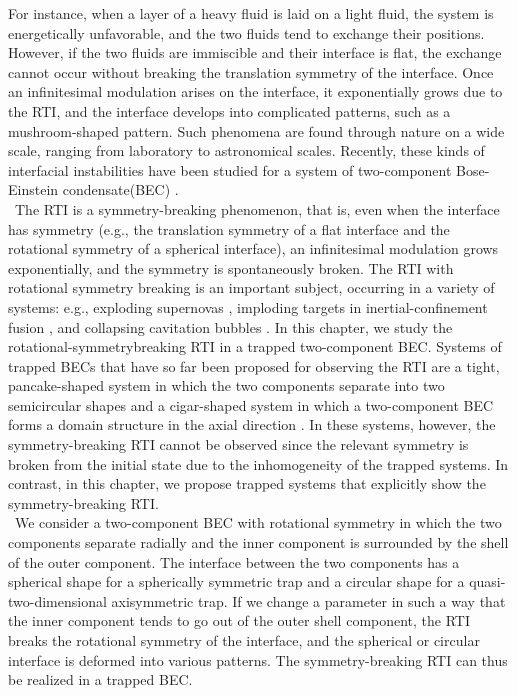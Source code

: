 \documentclass[12pt,a4paper]{report}
\begin{document}
For instance, when a layer of a heavy fluid is laid on a light fluid,
the system is energetically unfavorable, and the two fluids tend to exchange their positions.
However, if the two fluids are immiscible and their interface is flat,
the exchange cannot occur without breaking the translation symmetry of the interface.
Once an infinitesimal modulation arises on the interface,
it exponentially grows due to the RTI,
and the interface develops into complicated patterns,
such as a mushroom-shaped pattern.
Such phenomena are found through nature on a wide scale,
ranging from laboratory to astronomical scales.
Recently, these kinds of interfacial instabilities have been
studied for a system of two-component Bose-Einstein condensate(BEC) \cite{62}\cite{63}\cite{64}\cite{65}.
\\
\ The RTI is a symmetry-breaking phenomenon, that is,
even when the interface has symmetry
(e.g., the translation symmetry of a flat interface and the rotational symmetry
of a spherical interface), an infinitesimal modulation grows
exponentially, and the symmetry is spontaneously broken.
The RTI with rotational symmetry breaking is an important subject,
occurring in a variety of systems:
e.g., exploding supernovas \cite{66}\cite{67}\cite{68}, 
imploding targets in inertial-confinement fusion \cite{69},
and collapsing cavitation bubbles \cite{70} \cite{71}.
In this chapter, we study the rotational-symmetrybreaking RTI
in a trapped two-component BEC.
Systems of trapped BECs that have so far been proposed for observing the RTI
are a tight,
pancake-shaped system in which the two components separate into two semicircular shapes \cite{62}
and a cigar-shaped system in which a two-component BEC forms a domain
structure in the axial direction \cite{63}.
In these systems, however, the symmetry-breaking RTI cannot be observed since 
the relevant symmetry is broken from the initial state due to the inhomogeneity of the trapped systems.
In contrast, in this chapter, we propose trapped systems that explicitly show the symmetry-breaking RTI.
\\
\ We consider a two-component BEC with rotational symmetry in which the two components separate radially and
the inner component is surrounded by the shell of the outer component.
The interface between the two components has a spherical shape for a spherically symmetric trap
and a circular shape for a quasi-two-dimensional axisymmetric trap.
If we change a parameter in such a way that the inner component tends to go out of
the outer shell component,
the RTI breaks the rotational symmetry of the interface, and the spherical or
circular interface is deformed into various patterns.
The symmetry-breaking RTI can thus be realized in a trapped BEC.
\end{document}
